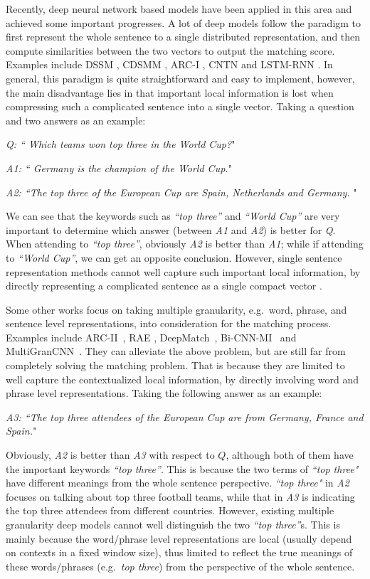 \documentclass[letterpaper]{article}
\begin{document}
Recently, deep neural network based models have been applied in this area and achieved some important progresses.
A lot of deep models follow the paradigm to first represent the whole sentence to a single distributed representation, and then compute similarities between the two vectors to output the matching score. Examples include DSSM \cite{huang2013learning}, CDSMM \cite{export:226585}, ARC-I \cite{DBLP:conf/nips/HuLLC14}, CNTN \cite{DBLP:conf/ijcai/QiuH15} and LSTM-RNN \cite{palangi2015deep}.
In general, this paradigm is quite straightforward and easy to implement, however, the main disadvantage lies in that important local information is lost when compressing such a complicated sentence into a single vector. Taking a question and two answers as an example:

{\em Q: `` Which teams won top three in the World Cup?}"

{\em A1: `` Germany is the champion of the World Cup.}"

{\em A2: ``The top three of the European Cup are Spain, Netherlands and Germany. }"

We can see that the keywords such as {\em``top three''} and {\em``World Cup''} are very important to determine which answer (between {\em A1} and {\em A2}) is better for {\em Q}. When attending to {\em``top three''}, obviously {\em A2} is better than  {\em A1}; while if attending to {\em``World Cup''}, we can get an opposite conclusion.
However, single sentence representation methods cannot well capture such important local information, by directly representing a complicated sentence as a single compact vector \cite{bahdanau2014neural}.

Some other works focus on taking multiple granularity, e.g.~word, phrase, and sentence level representations, into consideration for the matching process. Examples include ARC-II~\cite{DBLP:conf/nips/HuLLC14}, RAE \cite{socher2011dynamic}, DeepMatch~\cite{DBLP:conf/nips/LuL13}, Bi-CNN-MI~\cite{DBLP:conf/naacl/YinS15} and MultiGranCNN~\cite{DBLP:conf/acl/YinS15}. They can alleviate the above problem, but are still far from completely solving the matching problem.
That is because they are limited to well capture the contextualized local information, by directly involving word and phrase level representations. Taking the following answer as an example:

{\em A3: ``The top three attendees of the European Cup are from Germany, France and Spain.}"

Obviously, {\em A2} is better than {\em A3} with respect to $Q$, although both of them have the important keywords {\em``top three''}. This is because the two terms of {\em``top three"} have different meanings from the whole sentence perspective. {\em``top three"} in {\em A2} focuses on talking about top three football teams, while that in {\em A3} is indicating the top three attendees from different countries. However, existing multiple granularity deep models cannot well distinguish the two {\em``top three''}s. This is mainly because the word/phrase level representations are local (usually depend on contexts in a fixed window size), thus limited to reflect the true meanings of these words/phrases (e.g.~{\em top three}) from the perspective of the whole sentence.
\end{document}
